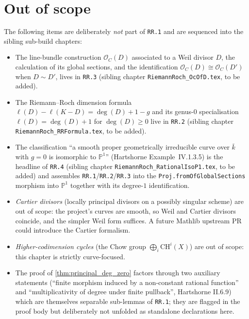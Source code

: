 \section{Out of scope}
The following items are deliberately \emph{not} part of \texttt{RR.1} and
are sequenced into the sibling sub-build chapters:
\begin{itemize}
  \item The line-bundle construction \(\mathcal O_C(D)\) associated to a Weil
    divisor \(D\), the calculation of its global sections, and the
    identification \(\mathcal O_C(D) \cong \mathcal O_C(D')\) when
    \(D \sim D'\), lives in \texttt{RR.3} (sibling chapter
    \texttt{RiemannRoch\_OcOfD.tex}, to be added).
  \item The Riemann--Roch dimension formula
    \(\ell(D) - \ell(K - D) = \deg(D) + 1 - g\) and its genus-\(0\) specialisation
    \(\ell(D) = \deg(D) + 1\) for \(\deg(D) \geq 0\) live in \texttt{RR.2}
    (sibling chapter \texttt{RiemannRoch\_RRFormula.tex}, to be added).
  \item The classification ``a smooth proper geometrically irreducible
    curve over \(\bar k\) with \(g = 0\) is isomorphic to \(\mathbb P^1\)''
    (Hartshorne Example~IV.1.3.5) is the headline of \texttt{RR.4}
    (sibling chapter \texttt{RiemannRoch\_RationalIsoP1.tex}, to be added)
    and assembles \texttt{RR.1}/\texttt{RR.2}/\texttt{RR.3} into the
    \texttt{Proj.fromOfGlobalSections} morphism into \(\mathbb P^1\) together
    with its degree-\(1\) identification.
  \item \emph{Cartier divisors} (locally principal divisors on a possibly
    singular scheme) are out of scope: the project's curves are smooth, so
    Weil and Cartier divisors coincide, and the simpler Weil form suffices.
    A future Mathlib upstream PR could introduce the Cartier formalism.
  \item \emph{Higher-codimension cycles} (the Chow group
    \(\bigoplus_i \mathrm{CH}^i(X)\)) are out of scope: this chapter is
    strictly curve-focused.
  \item The proof of \ref{thm:principal_deg_zero} factors through two
    auxiliary statements (``finite morphism induced by a non-constant
    rational function'' and ``multiplicativity of degree under finite
    pullback'', Hartshorne II.6.9) which are themselves separable
    sub-lemmas of \texttt{RR.1}; they are flagged in the proof body but
    deliberately not unfolded as standalone declarations here.
\end{itemize}
